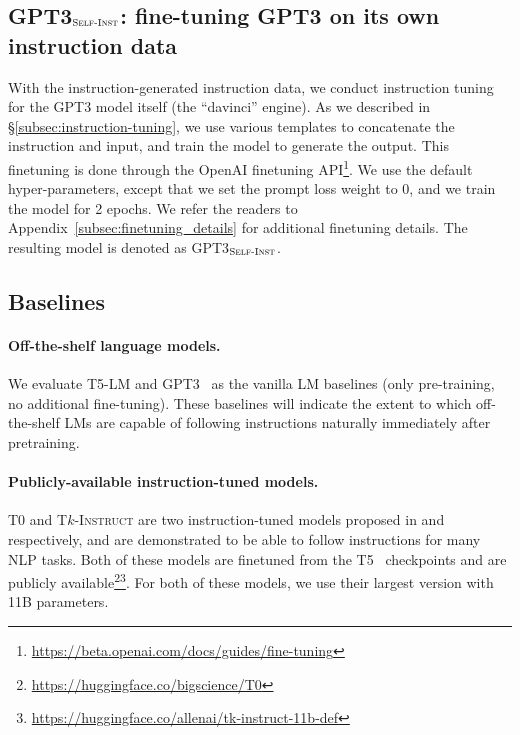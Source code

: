 \documentclass[11pt]{article}
\newcommand{\daniel}[1]{\textcolor{blue}{[DK: #1]}}
\newcommand{\tkinstruct}{\textsc{T$k$-Instruct}}
\newcommand{\tzero}{\textsc{T$0$}}
\newcommand{\gptthree}{\textsc{GPT3}}
\newcommand{\gptself}{\textsc{GPT3}$_{\textsc{Self-Inst}}$}
\begin{document}
\subsection{\gptself{}: fine-tuning \gptthree{} on its own instruction data}
\label{subsec:self-instruct-gpt3}
With the instruction-generated instruction data, we conduct instruction tuning for the \gptthree{} model itself (the ``davinci'' engine). As we described in \S\ref{subsec:instruction-tuning}, we use various templates to concatenate the instruction and input, and train the model to generate the output. This finetuning is done through the OpenAI finetuning API\footnote{\url{https://beta.openai.com/docs/guides/fine-tuning}}. We use the default hyper-parameters, except that we set the prompt loss weight to 0, and we train the model for 2 epochs. We refer the readers to Appendix~\ref{subsec:finetuning_details} for additional finetuning details. The resulting model is denoted as \gptself{}.

\subsection{Baselines}
\paragraph{Off-the-shelf language models.} 
We evaluate T5-LM \cite{lester2021power,raffel2020exploring} and \gptthree{}~\cite{brown2020gpt3} as the vanilla LM baselines (only pre-training, no additional fine-tuning). 
These baselines will indicate the extent to which off-the-shelf LMs are capable of following instructions naturally immediately after pretraining.

\paragraph{Publicly-available instruction-tuned models.}
\tzero{} and \tkinstruct{} are two instruction-tuned models proposed in \citet{sanh2022multitask} and \citet{wang2022benchmarking} respectively, and are demonstrated to be able to follow instructions for many NLP tasks. 
Both of these models are finetuned from the T5~\cite{raffel2020exploring} checkpoints and are publicly available\footnote{\url{https://huggingface.co/bigscience/T0}}\footnote{\url{https://huggingface.co/allenai/tk-instruct-11b-def}}. For both of these models, we use their largest version with 11B parameters.
\end{document}
